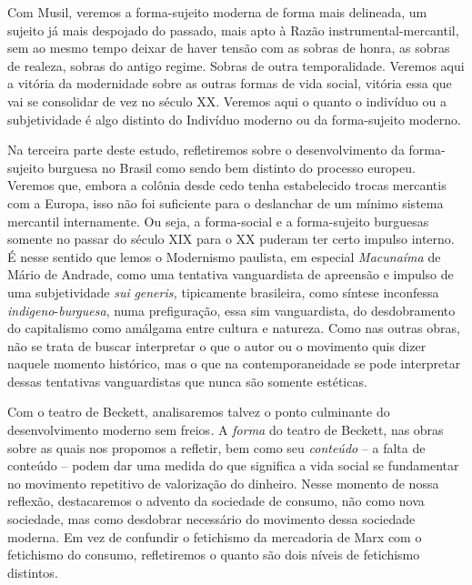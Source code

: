 Com Musil, veremos a forma-sujeito moderna de forma mais delineada, um
sujeito já mais despojado do passado, mais apto à Razão
instrumental-mercantil, sem ao mesmo tempo deixar de haver tensão com as
sobras de honra, as sobras de realeza, sobras do antigo regime. Sobras
de outra temporalidade. Veremos aqui a vitória da modernidade sobre as
outras formas de vida social, vitória essa que vai se consolidar de vez
no século XX. Veremos aqui o quanto o indivíduo ou a subjetividade é
algo distinto do Indivíduo moderno ou da forma-sujeito moderno.

Na terceira parte deste estudo, refletiremos sobre o desenvolvimento da
forma-sujeito burguesa no Brasil como sendo bem distinto do processo
europeu. Veremos que, embora a colônia desde cedo tenha estabelecido
trocas mercantis com a Europa, isso não foi suficiente para o deslanchar
de um mínimo sistema mercantil internamente. Ou seja, a forma-social e a
forma-sujeito burguesas somente no passar do século XIX para o XX
puderam ter certo impulso interno. É nesse sentido que lemos o
Modernismo paulista, em especial \emph{Macunaíma} de Mário de Andrade,
como uma tentativa vanguardista de apreensão e impulso de uma
subjetividade \emph{sui} \emph{generis,} tipicamente brasileira, como
síntese inconfessa \emph{indigeno}-\emph{burguesa}, numa prefiguração,
essa sim vanguardista, do desdobramento do capitalismo como amálgama
entre cultura e natureza. Como nas outras obras, não se trata de buscar
interpretar o que o autor ou o movimento quis dizer naquele momento
histórico, mas o que na contemporaneidade se pode interpretar dessas
tentativas vanguardistas que nunca são somente estéticas.

Com o teatro de Beckett, analisaremos talvez o ponto culminante do
desenvolvimento moderno sem freios\emph{.} A \emph{forma} do teatro de
Beckett, nas obras sobre as quais nos propomos a refletir, bem como seu
\emph{conteúdo} -- a falta de conteúdo -- podem dar uma medida do que
significa a vida social se fundamentar no movimento repetitivo de
valorização do dinheiro. Nesse momento de nossa reflexão, destacaremos o
advento da sociedade de consumo, não como nova sociedade, mas como
desdobrar necessário do movimento dessa sociedade moderna. Em vez de
confundir o fetichismo da mercadoria de Marx com o fetichismo do
consumo, refletiremos o quanto são dois níveis de fetichismo distintos.

